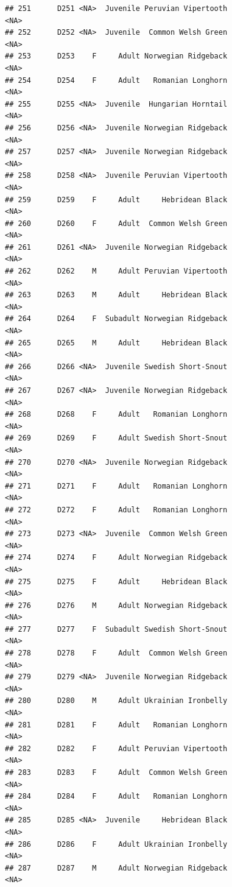 \documentclass[
]{book}
\begin{document}
\begin{verbatim}
## 251      D251 <NA>  Juvenile Peruvian Vipertooth                <NA>
## 252      D252 <NA>  Juvenile  Common Welsh Green                <NA>
## 253      D253    F     Adult Norwegian Ridgeback                <NA>
## 254      D254    F     Adult   Romanian Longhorn                <NA>
## 255      D255 <NA>  Juvenile  Hungarian Horntail                <NA>
## 256      D256 <NA>  Juvenile Norwegian Ridgeback                <NA>
## 257      D257 <NA>  Juvenile Norwegian Ridgeback                <NA>
## 258      D258 <NA>  Juvenile Peruvian Vipertooth                <NA>
## 259      D259    F     Adult     Hebridean Black                <NA>
## 260      D260    F     Adult  Common Welsh Green                <NA>
## 261      D261 <NA>  Juvenile Norwegian Ridgeback                <NA>
## 262      D262    M     Adult Peruvian Vipertooth                <NA>
## 263      D263    M     Adult     Hebridean Black                <NA>
## 264      D264    F  Subadult Norwegian Ridgeback                <NA>
## 265      D265    M     Adult     Hebridean Black                <NA>
## 266      D266 <NA>  Juvenile Swedish Short-Snout                <NA>
## 267      D267 <NA>  Juvenile Norwegian Ridgeback                <NA>
## 268      D268    F     Adult   Romanian Longhorn                <NA>
## 269      D269    F     Adult Swedish Short-Snout                <NA>
## 270      D270 <NA>  Juvenile Norwegian Ridgeback                <NA>
## 271      D271    F     Adult   Romanian Longhorn                <NA>
## 272      D272    F     Adult   Romanian Longhorn                <NA>
## 273      D273 <NA>  Juvenile  Common Welsh Green                <NA>
## 274      D274    F     Adult Norwegian Ridgeback                <NA>
## 275      D275    F     Adult     Hebridean Black                <NA>
## 276      D276    M     Adult Norwegian Ridgeback                <NA>
## 277      D277    F  Subadult Swedish Short-Snout                <NA>
## 278      D278    F     Adult  Common Welsh Green                <NA>
## 279      D279 <NA>  Juvenile Norwegian Ridgeback                <NA>
## 280      D280    M     Adult Ukrainian Ironbelly                <NA>
## 281      D281    F     Adult   Romanian Longhorn                <NA>
## 282      D282    F     Adult Peruvian Vipertooth                <NA>
## 283      D283    F     Adult  Common Welsh Green                <NA>
## 284      D284    F     Adult   Romanian Longhorn                <NA>
## 285      D285 <NA>  Juvenile     Hebridean Black                <NA>
## 286      D286    F     Adult Ukrainian Ironbelly                <NA>
## 287      D287    M     Adult Norwegian Ridgeback                <NA>

\end{verbatim}
\end{document}
